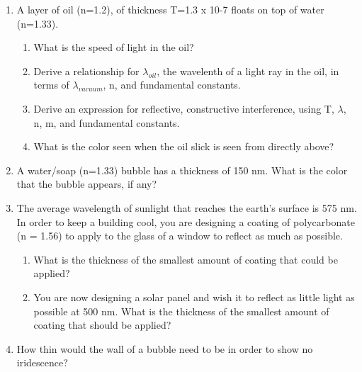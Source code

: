 \documentclass[letterpaper, 12pt]{article}
\begin{document}
\begin{enumerate}

\item A layer of oil (n=1.2), of thickness T=1.3 x 10-7  floats on top of water (n=1.33).
	\begin{enumerate}
		\item What is the speed of light in the oil?
		\vspace{1 in}
		\item Derive a relationship for $\lambda_{oil}$, the wavelenth of a light ray in the oil, in terms of $\lambda_{vacuum}$, n, and fundamental constants.  
		\vspace{1 in}
		\item Derive an expression for reflective, constructive interference, using T, $\lambda$, n, m, and fundamental constants.
		\vspace{1 in}
		\item What is the color seen when the oil slick is seen from directly above?
		\vspace{1 in}
	\end{enumerate}
\item A water/soap (n=1.33) bubble has a thickness of 150 nm.  What is the color that the bubble appears, if any?
	\vspace{1 in}
\item The average wavelength of sunlight that reaches the earth’s surface is 575 nm.  In order to keep a building cool, you are designing a coating of polycarbonate (n = 1.56) to apply to the glass of a window to reflect as much as possible.  
\begin{enumerate}
	\item What is the thickness of the smallest amount of coating that could be applied?
	\vspace{2in}
	\item You are now designing a solar panel and wish it to reflect as little light as possible at 500 nm.  What is the thickness of the smallest amount of coating that should be applied?
	
	
\end{enumerate}

\vspace {2in}
\item How thin would the wall of a bubble need to be in order to show no iridescence?



	
\end{enumerate}
 
\end{document}
